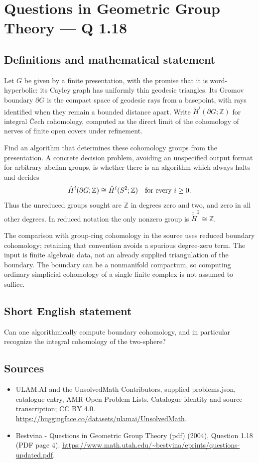 \documentclass[11pt,a4paper]{article}
\begin{document}
\section*{Questions in Geometric Group Theory — Q 1.18}\label{statement}

\subsection{Definitions and mathematical statement}
Let $G$ be given by a finite presentation, with the promise that it is word-hyperbolic: its Cayley graph has uniformly thin geodesic triangles. Its Gromov boundary $\partial G$ is the compact space of geodesic rays from a basepoint, with rays identified when they remain a bounded distance apart. Write $\check H^i(\partial G;\mathbb Z)$ for integral \v{C}ech cohomology, computed as the direct limit of the cohomology of nerves of finite open covers under refinement.

Find an algorithm that determines these cohomology groups from the presentation. A concrete decision problem, avoiding an unspecified output format for arbitrary abelian groups, is whether there is an algorithm which always halts and decides
\[
 \check H^i(\partial G;\mathbb Z)\cong
 \check H^i(S^2;\mathbb Z)\quad\hbox{for every }i\geq0.
\]
Thus the unreduced groups sought are $\mathbb Z$ in degrees zero and two, and zero in all other degrees. In reduced notation the only nonzero group is $\widetilde{\check H}^{2}\cong\mathbb Z$.

The comparison with group-ring cohomology in the source uses reduced boundary cohomology; retaining that convention avoids a spurious degree-zero term. The input is finite algebraic data, not an already supplied triangulation of the boundary. The boundary can be a nonmanifold compactum, so computing ordinary simplicial cohomology of a single finite complex is not assumed to suffice.
\subsection{Short English statement}
Can one algorithmically compute boundary cohomology, and in particular recognize the integral cohomology of the two-sphere?
\subsection{Sources}
\begin{itemize}
\item[S1] ULAM.AI and the UnsolvedMath Contributors, supplied problems.json, catalogue entry, AMR Open Problem Lists. Catalogue identity and source transcription; CC BY 4.0.
\url{https://huggingface.co/datasets/ulamai/UnsolvedMath}.
\item[S2] Bestvina - Questions in Geometric Group Theory (pdf) (2004), Question 1.18 (PDF page 4). 
\url{https://www.math.utah.edu/~bestvina/eprints/questions-updated.pdf}.
\end{itemize}
\end{document}
